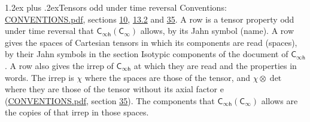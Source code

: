 \documentclass[10pt,a4paper]{article}
\makeatletter
\renewcommand\section{\@startsection{section}{1}{\z@}{-3ex plus -1ex minus -.2ex}%
  {1.2ex plus .2ex}{\normalfont\large\sffamily\bfseries\color{parttitle}}}
\numberwithin{equation}{section}
\newcommand{\grp}[1]{\mathsf{#1}}
\newcommand{\irrprod}{\otimes}
\makeatother
\begin{document}
\section{Tensors odd under time reversal}\label{s:time_odd}
Conventions: \href{../../CONVENTIONS.pdf}{CONVENTIONS.pdf}, sections \href{../../../rotation/CONVENTIONS.pdf\#conv.10}{10}, \href{../../../rotation/CONVENTIONS.pdf\#conv.13.2}{13.2} and \href{../../CONVENTIONS.pdf\#conv.35}{35}.
\leavevmode\label{n:head.name.property}A row is a tensor property odd under time reversal that $\grp{C_{\infty h}}(\grp{C_{\infty}})$ allows, by its Jahn symbol (name). \label{n:head.spaces}A row gives the spaces of Cartesian tensors in which its components are read (spaces), by their Jahn symbols in the section Isotypic components of the document of \href{../../../rotation/data/pdf/Cinfh.pdf}{$\grp{C_{\infty h}}$}. \label{n:head.irrep}\label{n:head.properties}A row also gives the irrep of $\grp{C_{\infty h}}$ at which they are read and the properties in words. The irrep is $\chi$ where the spaces are those of the tensor, and $\chi \irrprod \det$ where they are those of the tensor without its axial factor e (\href{../../CONVENTIONS.pdf}{CONVENTIONS.pdf}, section \href{../../CONVENTIONS.pdf\#conv.35}{35}). The components that $\grp{C_{\infty h}}(\grp{C_{\infty}})$ allows are the copies of that irrep in those spaces.
\end{document}
